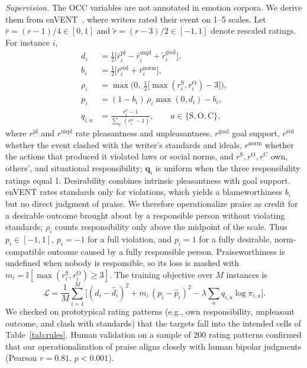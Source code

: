 \documentclass[conference, a4paper]{IEEEtran}
\begin{document}
\textit{Supervision.} The OCC variables are not annotated in emotion corpora. We derive them from enVENT~\cite{troiano2023dimensional}, where writers rated their event on 1--5 scales. Let $\bar r = (r-1)/4 \in [0,1]$ and $\tilde r = (r-3)/2 \in [-1,1]$ denote rescaled ratings. For instance $i$,
\begin{equation}
\begin{aligned}
    d_i &= \tfrac{1}{2}\big[\bar r_i^{\mathrm{pl}} - \bar r_i^{\mathrm{unpl}} + \tilde r_i^{\mathrm{goal}}\big], \\
    b_i &= \tfrac{1}{2}\big[\bar r_i^{\mathrm{std}} + \bar r_i^{\mathrm{norm}}\big], \\
    \rho_i &= \max\!\big(0,\ \tfrac{1}{2}\big[\max(r_i^{\mathrm{S}}, r_i^{\mathrm{O}}) - 3\big]\big), \\
    p_i &= (1 - b_i)\, \rho_i \max(0, d_i) - b_i, \\
    q_{i,a} &= \frac{r_i^{a} - 1}{\sum_{a'} (r_i^{a'} - 1)}, \qquad a \in \{\mathrm{S}, \mathrm{O}, \mathrm{C}\},
\end{aligned}
\end{equation}
where $r^{\mathrm{pl}}$ and $r^{\mathrm{unpl}}$ rate pleasantness and unpleasantness, $r^{\mathrm{goal}}$ goal support, $r^{\mathrm{std}}$ whether the event clashed with the writer's standards and ideals, $r^{\mathrm{norm}}$ whether the actions that produced it violated laws or social norms, and $r^{\mathrm{S}}, r^{\mathrm{O}}, r^{\mathrm{C}}$ own, others', and situational responsibility; $\mathbf{q}_i$ is uniform when the three responsibility ratings equal 1. Desirability combines intrinsic pleasantness with goal support. enVENT rates standards only for violations, which yields a blameworthiness $b_i$ but no direct judgment of praise. We therefore operationalize praise as credit for a desirable outcome brought about by a responsible person without violating standards; $\rho_i$ counts responsibility only above the midpoint of the scale. Thus $p_i \in [-1,1]$, $p_i = -1$ for a full violation, and $p_i = 1$ for a fully desirable, norm-compatible outcome caused by a fully responsible person. Praiseworthiness is undefined when nobody is responsible, so its loss is masked with $m_i = \mathbb{I}[\max(r_i^{\mathrm{S}}, r_i^{\mathrm{O}}) \ge 3]$. The training objective over $M$ instances is
\begin{equation}
    \mathcal{L} = \frac{1}{M}\sum_{i=1}^{M} \Big[(d_i - \hat d_i)^2 + m_i\,(p_i - \hat p_i)^2 - \lambda \sum_{a} q_{i,a} \log \pi_{i,a}\Big].
\end{equation}
We checked on prototypical rating patterns (e.g., own responsibility, unpleasant outcome, and clash with standards) that the targets fall into the intended cells of Table~\ref{tab:rules}. Human validation on a sample of 200 rating patterns confirmed that our operationalization of praise aligns closely with human bipolar judgments (Pearson $r = 0.81$, $p < 0.001$).
\end{document}
